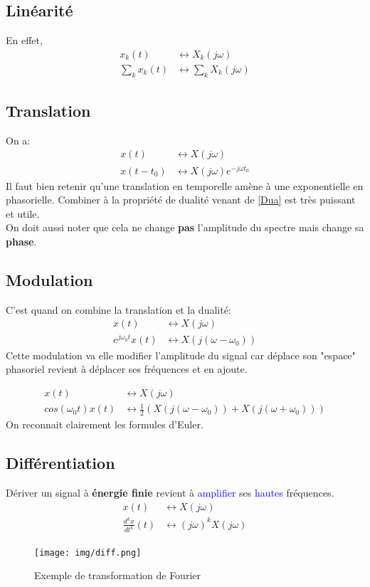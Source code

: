 \documentclass{report}
\begin{document}
\subsection{Linéarité}
En effet,
\begin{align*}
x_k(t) & \longleftrightarrow X_k(j\omega)\\
\sum_k x_k(t) & \longleftrightarrow \sum_k X_k(j\omega)
\end{align*}

\subsection{Translation}
On a:
\begin{align*}
x(t) & \longleftrightarrow X(j\omega)\\
x(t-t_0) & \longleftrightarrow X(j\omega)e^{-j \omega t_0}
\end{align*}
Il faut bien retenir qu'une translation en temporelle amène à une exponentielle en phasorielle. Combiner à la propriété de dualité venant de \ref{Dua} est très puissant et utile.\\
On doit aussi noter que cela ne change \textbf{pas} l'amplitude du spectre mais change sa \textbf{phase}.

\subsection{Modulation}
C'est quand on combine la translation et la dualité:
\begin{align*}
x(t) & \longleftrightarrow X(j\omega)\\
e^{j\omega_0 t}x(t) & \longleftrightarrow X(j(\omega - \omega_0))
\end{align*}
Cette modulation va elle modifier l'amplitude du signal car déplace son "espace" phasoriel revient à déplacer ses fréquences et en ajoute.

\begin{align*}
x(t) & \longleftrightarrow X(j\omega)\\
cos(\omega_0 t)x(t) &\longleftrightarrow \frac{1}{2}(X(j(\omega - \omega_0)) + X(j(\omega + \omega_0))) 
\end{align*}
On reconnait clairement les formules d'Euler.

\subsection{Différentiation}
Dériver un signal à \textbf{énergie finie} revient à \textcolor{blue}{amplifier} ses \textcolor{blue}{hautes} fréquences.
\begin{align*}
x(t) &\longleftrightarrow X(j\omega)\\
\frac{d^kx}{dt^k}(t) &\longleftrightarrow (j\omega)^kX(j\omega)
\end{align*}
\begin{figure}[H]
\centering
\texttt{[image: img/diff.png]}
\caption{Exemple de transformation de Fourier}
\end{figure}
\end{document}
